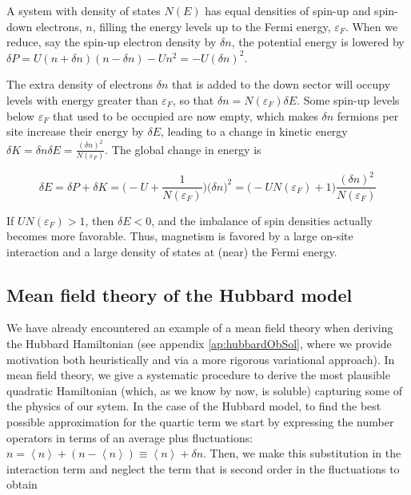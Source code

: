 A system with density of states $N(E)$ has equal densities of spin-up and spin-down electrons, $n$, filling the energy levels up to the Fermi energy, $\varepsilon_F$.
When we reduce, say the spin-up electron density by $\delta n$, the potential energy is lowered by $\delta P = U ( n + \delta n ) ( n - \delta n ) - U n^2 = - U (\delta n)^2$.

The extra density of electrons $\delta n$ that is added to the down sector will occupy levels with energy greater than $\varepsilon_F$, so that $\delta n = N ( \varepsilon_F ) \delta E$.
Some spin-up levels below $\varepsilon_F$ that used to be occupied are now empty, which makes $\delta n$ fermions per site increase their energy by $\delta E$, leading to a change in kinetic energy $\delta K = \delta n \delta E = \frac{(\delta n)^2}{N(\varepsilon_F)}$.
The global change in energy is

\begin{equation}
\delta E = \delta P + \delta K = \bigg( - U + \frac{1}{N(\varepsilon_F)} \bigg) \big( \delta n \big)^2 = \bigg( - U N ( \varepsilon_F ) + 1 \bigg) \frac{(\delta n)^2}{N(\varepsilon_F)}
\end{equation}

If $U N ( \varepsilon_F ) > 1$, then $\delta E < 0$, and the imbalance of spin densities actually becomes more favorable.
Thus, magnetism is favored by a large on-site interaction and a large density of states at (near) the Fermi energy.

\subsection{Mean field theory of the Hubbard model}

We have already encountered an example of a mean field theory when deriving the Hubbard Hamiltonian (see appendix \ref{ap:hubbardObSol}, where we provide motivation both heuristically and via a more rigorous variational approach).
In mean field theory, we give a systematic procedure to derive the most plausible quadratic Hamiltonian (which, as we know by now, is soluble) capturing some of the physics of our sytem.
In the case of the Hubbard model, to find the best possible approximation for the quartic term we start by expressing the number operators in terms of an average plus fluctuations: $n = \left\langle n \right\rangle + ( n - \left\langle n \right\rangle ) \equiv \left\langle n \right\rangle + \delta n$.
Then, we make this substitution in the interaction term and neglect the term that is second order in the fluctuations to obtain

